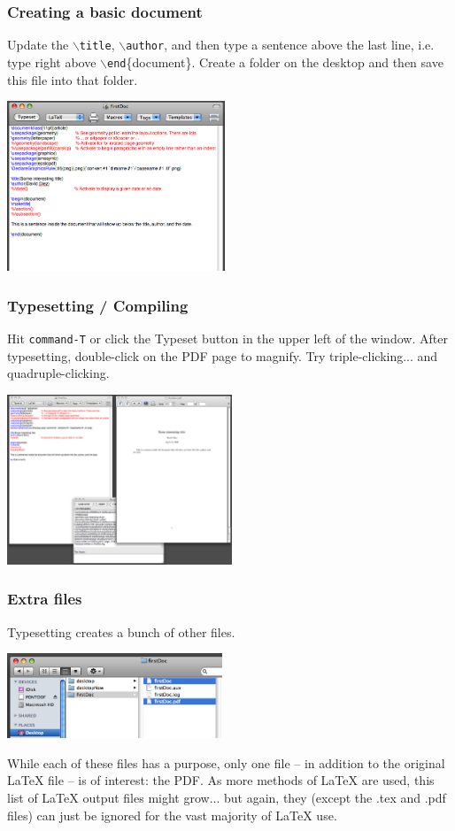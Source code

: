 \documentclass[slidestop,compress,mathserif]{beamer}
\begin{document}
\begin{frame} \frametitle{Creating a basic document}
Update the \texttt{\color{command}$\backslash$title}, \texttt{\color{command}$\backslash$author}, and then type a sentence above the last line, i.e. type right above \texttt{\color{command}$\backslash$end}{\color{braces}\{}document{\color{braces}\}}. Create a folder on the desktop and then save this file into that folder.
\begin{center}
\includegraphics[height=2.0in]{basicsOfLatex/gettingStarted/firstDoc}
\end{center}
\end{frame}

\begin{frame} \frametitle{Typesetting / Compiling}
Hit \texttt{\color{highlight}command-T} or click the {\color{highlight}Typeset} button in the upper left of the window. After typesetting, double-click on the PDF page to magnify. Try triple-clicking... and quadruple-clicking.
\begin{center}
\includegraphics[height=2.0in]{basicsOfLatex/gettingStarted/firstOutput}
\end{center}
\end{frame}

\begin{frame} \frametitle{Extra files}
Typesetting creates a bunch of other files.
\begin{center}
\includegraphics[height=1.0in]{basicsOfLatex/gettingStarted/outputFiles}
\end{center}
While each of these files has a purpose, only one file -- in addition to the original LaTeX file -- is of interest: the PDF. As more methods of LaTeX are used, this list of LaTeX output files might grow... but again, they (except the .tex and .pdf files) can just be ignored for the vast majority of LaTeX use.
\end{frame}
\end{document}
